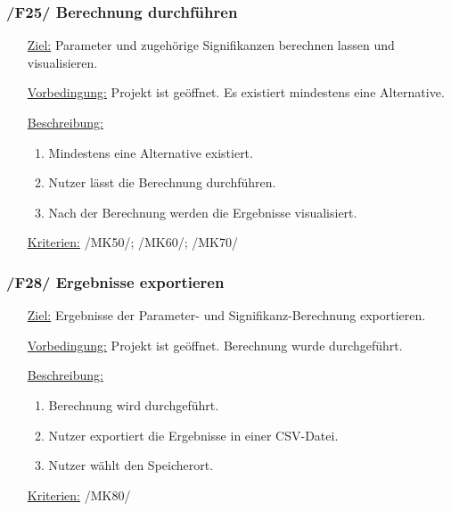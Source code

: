 \documentclass{article}
\begin{document}
\subsubsection*{\textbf{/F25/} Berechnung durchführen} \label{sec:f:Berechnung durchführen}
\begin{itemize}
    \item[\underline{Ziel:}] Parameter und zugehörige Signifikanzen berechnen lassen und visualisieren.
    \item[\underline{Vorbedingung:}] Projekt ist geöffnet. Es existiert mindestens eine Alternative.
    \item[\underline{Beschreibung:}]
    \begin{enumerate}
        \item Mindestens eine Alternative existiert.
        \item Nutzer lässt die Berechnung durchführen.
        \item Nach der Berechnung werden die Ergebnisse visualisiert.
    \end{enumerate}
    \item[\underline{Kriterien:}] /MK50/; /MK60/; /MK70/ 
\end{itemize} 

\subsubsection*{\textbf{/F28/} Ergebnisse exportieren} \label{sec:f:Ergebnisse exportieren}
\begin{itemize}
    \item[\underline{Ziel:}] Ergebnisse der Parameter- und Signifikanz-Berechnung exportieren.
    \item[\underline{Vorbedingung:}] Projekt ist geöffnet. Berechnung wurde durchgeführt.
    \item[\underline{Beschreibung:}]
    \begin{enumerate}
        \item Berechnung wird durchgeführt.
        \item Nutzer exportiert die Ergebnisse in einer CSV-Datei.
        \item Nutzer wählt den Speicherort.
    \end{enumerate}
    \item[\underline{Kriterien:}] /MK80/
\end{itemize}
\end{document}
